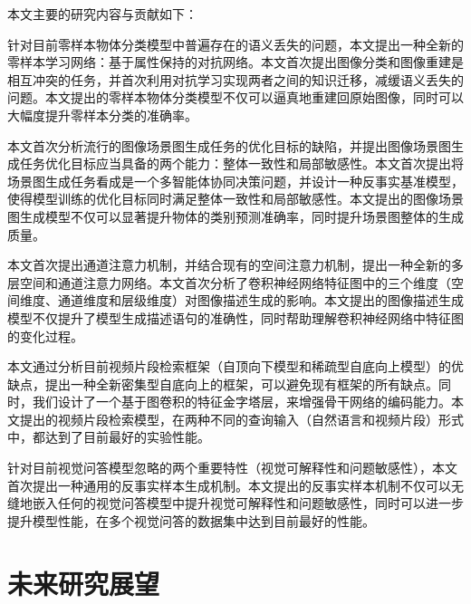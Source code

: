 本文主要的研究内容与贡献如下：
\begin{asparaenum}
\item 针对目前零样本物体分类模型中普遍存在的语义丢失的问题，本文提出一种全新的零样本学习网络：基于属性保持的对抗网络。本文首次提出图像分类和图像重建是相互冲突的任务，并首次利用对抗学习实现两者之间的知识迁移，减缓语义丢失的问题。本文提出的零样本物体分类模型不仅可以逼真地重建回原始图像，同时可以大幅度提升零样本分类的准确率。

\item 本文首次分析流行的图像场景图生成任务的优化目标的缺陷，并提出图像场景图生成任务优化目标应当具备的两个能力：整体一致性和局部敏感性。本文首次提出将场景图生成任务看成是一个多智能体协同决策问题，并设计一种反事实基准模型，使得模型训练的优化目标同时满足整体一致性和局部敏感性。本文提出的图像场景图生成模型不仅可以显著提升物体的类别预测准确率，同时提升场景图整体的生成质量。

\item 本文首次提出通道注意力机制，并结合现有的空间注意力机制，提出一种全新的多层空间和通道注意力网络。本文首次分析了卷积神经网络特征图中的三个维度（空间维度、通道维度和层级维度）对图像描述生成的影响。本文提出的图像描述生成模型不仅提升了模型生成描述语句的准确性，同时帮助理解卷积神经网络中特征图的变化过程。

\item 本文通过分析目前视频片段检索框架（自顶向下模型和稀疏型自底向上模型）的优缺点，提出一种全新密集型自底向上的框架，可以避免现有框架的所有缺点。同时，我们设计了一个基于图卷积的特征金字塔层，来增强骨干网络的编码能力。本文提出的视频片段检索模型，在两种不同的查询输入（自然语言和视频片段）形式中，都达到了目前最好的实验性能。

\item 针对目前视觉问答模型忽略的两个重要特性（视觉可解释性和问题敏感性），本文首次提出一种通用的反事实样本生成机制。本文提出的反事实样本机制不仅可以无缝地嵌入任何的视觉问答模型中提升视觉可解释性和问题敏感性，同时可以进一步提升模型性能，在多个视觉问答的数据集中达到目前最好的性能。

\end{asparaenum}

\section{未来研究展望}

